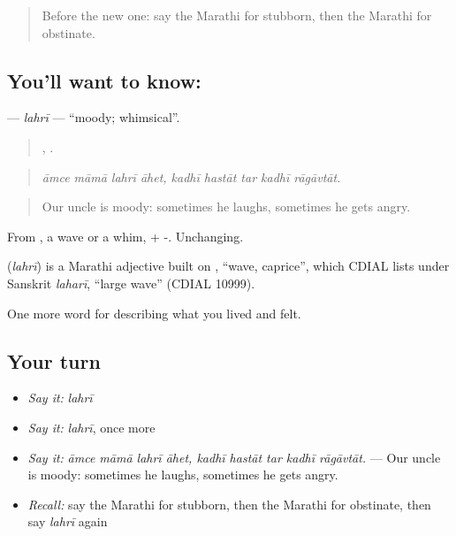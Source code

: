 \label{lesson:MR-C472-lahri}



\begin{quote}
Before the new one: say the Marathi for stubborn, then the Marathi for obstinate.
\end{quote}

\subsection*{You'll want to know: }
\textbf{} — \emph{lahrī} — \textquotedblleft{}moody; whimsical\textquotedblright{}.

\begin{quote}
   ,     .
\end{quote}

\begin{quote}
\emph{āmce māmā lahrī āhet, kadhī hastāt tar kadhī rāgāvtāt.}
\end{quote}

\begin{quote}
Our uncle is moody: sometimes he laughs, sometimes he gets angry.
\end{quote}

From , a wave or a whim, + -. Unchanging.

\begin{cousinweb}
\textbf{} (\emph{lahrī}) is a Marathi adjective built on , \textquotedblleft{}wave, caprice\textquotedblright{}, which CDIAL lists under Sanskrit \emph{laharī}, \textquotedblleft{}large wave\textquotedblright{} (CDIAL 10999).
\end{cousinweb}

\begin{grammarlens}[title={What you've built}]
One more word for describing what you lived and felt.
\end{grammarlens}

\subsection*{Your turn}
\begin{itemize}
\raggedright
  \item \emph{Say it:} \emph{lahrī}
  \item \emph{Say it:} \emph{lahrī}, once more
  \item \emph{Say it:} \emph{āmce māmā lahrī āhet, kadhī hastāt tar kadhī rāgāvtāt.} — Our uncle is moody: sometimes he laughs, sometimes he gets angry.
  \item \emph{Recall:} say the Marathi for stubborn, then the Marathi for obstinate, then say \emph{lahrī} again
\end{itemize}

